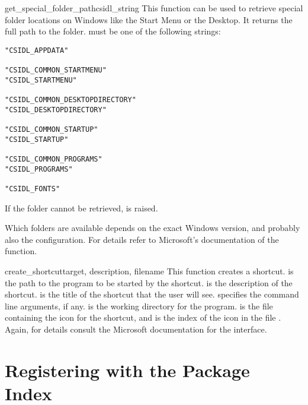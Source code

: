 \documentclass{manual}
\begin{document}
\begin{funcdesc}{get_special_folder_path}{csidl_string}
  This function can be used to retrieve special folder locations on
  Windows like the Start Menu or the Desktop.  It returns the full
  path to the folder.   must be one of the following
  strings:

\begin{verbatim}
"CSIDL_APPDATA"

"CSIDL_COMMON_STARTMENU"
"CSIDL_STARTMENU"

"CSIDL_COMMON_DESKTOPDIRECTORY"
"CSIDL_DESKTOPDIRECTORY"

"CSIDL_COMMON_STARTUP"
"CSIDL_STARTUP"

"CSIDL_COMMON_PROGRAMS"
"CSIDL_PROGRAMS"

"CSIDL_FONTS"
\end{verbatim}

  If the folder cannot be retrieved,  is raised.

  Which folders are available depends on the exact Windows version,
  and probably also the configuration.  For details refer to
  Microsoft's documentation of the
   function.
\end{funcdesc}

\begin{funcdesc}{create_shortcut}{target, description,
                                  filename}
  This function creates a shortcut.
   is the path to the program to be started by the shortcut.
   is the description of the shortcut.
   is the title of the shortcut that the user will see.
   specifies the command line arguments, if any.
   is the working directory for the program.
   is the file containing the icon for the shortcut,
  and  is the index of the icon in the file
  .  Again, for details consult the Microsoft
  documentation for the  interface.
\end{funcdesc}

\chapter{Registering with the Package Index}
\label{package-index}
\end{document}
